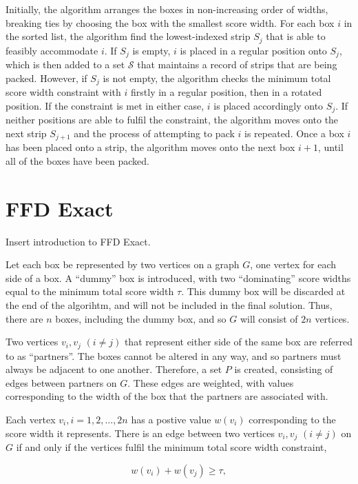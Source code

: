 \documentclass[oribibl]{llncs}
\begin{document}
Initially, the algorithm arranges the boxes in non-increasing order of widths, breaking ties by choosing the box with the smallest score width. For each box $i$ in the sorted list, the algorithm find the lowest-indexed strip $S_j$ that is able to feasibly accommodate $i$. If $S_j$ is empty, $i$ is placed in a regular position onto $S_j$, which is then added to a set $\mathcal{S}$ that maintains a record of strips that are being packed. However, if $S_j$ is not empty, the algorithm checks the minimum total score width constraint with $i$ firstly in a regular position, then in a rotated position. If the constraint is met in either case, $i$ is placed accordingly onto $S_j$. If neither positions are able to fulfil the constraint, the algorithm moves onto the next strip $S_{j+1}$ and the process of attempting to pack $i$ is repeated. Once a box $i$ has been placed onto a strip, the algorithm moves onto the next box $i+1$, until all of the boxes have been packed. 


\section{FFD Exact}
\label{sec:ffdexact}

Insert introduction to FFD Exact.

Let each box be represented by two vertices on a graph $G$, one vertex for each side of a box. A ``dummy'' box is introduced, with two ``dominating'' score widths equal to the minimum total score width $\tau$. This dummy box will be discarded at the end of the algorihtm, and will not be included in the final solution. Thus, there are $n$ boxes, including the dummy box, and so $G$ will consist of $2n$ vertices.

Two vertices $v_i, v_j$ $(i \neq j)$ that represent either side of the same box are referred to as ``partners''. The boxes cannot be altered in any way, and so partners must always be adjacent to one another. Therefore, a set $P$ is created, consisting of edges between partners on $G$. These edges are weighted, with values corresponding to the width of the box that the partners are associated with.

Each vertex $v_i, i = 1, 2, ..., 2n$ has a postive value $w(v_i)$ corresponding to the score width it represents. There is an edge between two vertices $v_i, v_j$ $(i \neq j)$ on $G$ if and only if the vertices fulfil the minimum total score width constraint,

\begin{equation*}
	\label{eqn:mtswcg}
	w(v_i) + w(v_j) \geq \tau,
\end{equation*}
\end{document}
